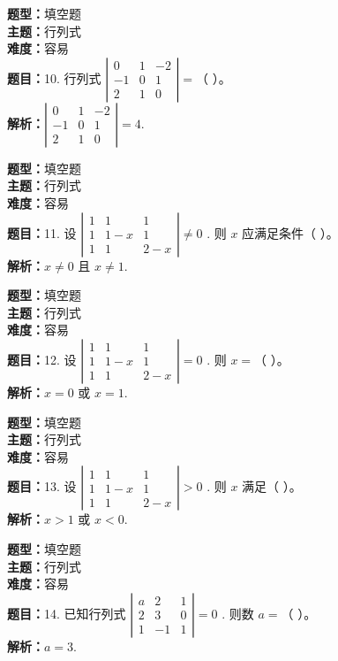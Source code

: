\documentclass{ctexart}
\newenvironment{question}[5]{%
	\noindent\textbf{题型：}#1\\
	\textbf{主题：}#2\\
	\textbf{难度：}#3\\
	\textbf{题目：}#4\\
	\textbf{解析：}#5\\
	\vspace{1em}
}{}
\begin{document}
\begin{question}
	{填空题}
	{行列式}
	{容易}
	{10. 行列式 $\left|\begin{array}{ccc}0 & 1 & -2 \\ -1 & 0 & 1 \\ 2 & 1 & 0\end{array}\right|=$（ ）。}
	{$\left|\begin{array}{ccc}0 & 1 & -2 \\ -1 & 0 & 1 \\ 2 & 1 & 0\end{array}\right|=4$.}
\end{question}

\begin{question}
	{填空题}
	{行列式}
	{容易}
	{11. 设 $\left|\begin{array}{ccc}1 & 1 & 1 \\ 1 & 1-x & 1 \\ 1 & 1 & 2-x\end{array}\right| \neq 0$ . 则 $x$ 应满足条件（ ）。}
	{$x \neq 0$ 且 $x \neq 1$.}
\end{question}

\begin{question}
	{填空题}
	{行列式}
	{容易}
	{12. 设 $\left|\begin{array}{ccc}1 & 1 & 1 \\ 1 & 1-x & 1 \\ 1 & 1 & 2-x\end{array}\right|=0$ . 则 $x=$（ ）。}
	{$x=0$ 或 $x=1$.}
\end{question}

\begin{question}
	{填空题}
	{行列式}
	{容易}
	{13. 设 $\left|\begin{array}{ccc}1 & 1 & 1 \\ 1 & 1-x & 1 \\ 1 & 1 & 2-x\end{array}\right|>0$ . 则 $x$ 满足（ ）。}
	{$x>1$ 或 $x<0$.}
\end{question}

\begin{question}
	{填空题}
	{行列式}
	{容易}
	{14. 已知行列式 $\left|\begin{array}{ccc}a & 2 & 1 \\ 2 & 3 & 0 \\ 1 & -1 & 1\end{array}\right|=0$ . 则数 $a=$（ ）。}
	{$a=3$.}
\end{question}
\end{document}
